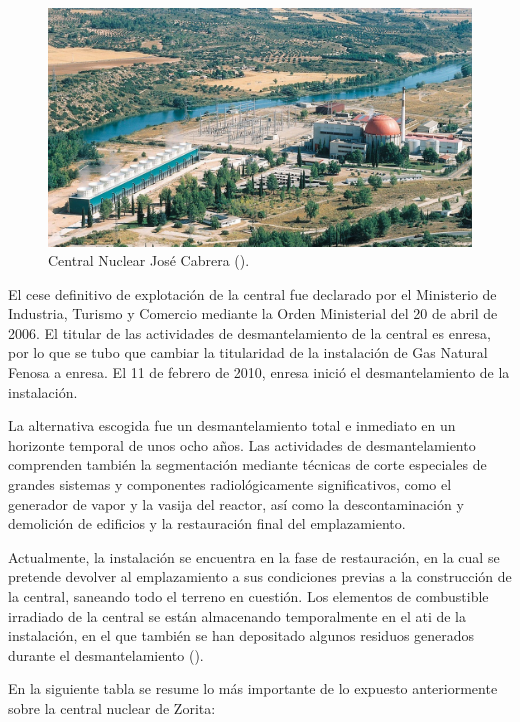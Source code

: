 \begin{figure}[h]
    \centering
    \includegraphics[width=\textwidth]{content/figures/zorita.jpg}
    \caption{Central Nuclear José Cabrera (\cite{sne_recursos_prensa}).}
    \label{fig:zorita}
\end{figure}

El cese definitivo de explotación de la central fue declarado por el Ministerio de Industria, Turismo y Comercio mediante la Orden Ministerial del 20 de abril de 2006. El titular de las actividades de desmantelamiento de la central es \acrshort{enresa}, por lo que se tubo que cambiar la titularidad de la instalación de Gas Natural Fenosa a \acrshort{enresa}. El 11 de febrero de 2010, \acrshort{enresa} inició el desmantelamiento de la instalación.

La alternativa escogida fue un desmantelamiento total e inmediato en un horizonte temporal de unos ocho años. Las actividades de desmantelamiento comprenden también la segmentación mediante técnicas de corte especiales de grandes sistemas y componentes radiológicamente significativos, como el generador de vapor y la vasija del reactor, así como la descontaminación y demolición de edificios y la restauración final del emplazamiento. 

Actualmente, la instalación se encuentra en la fase de restauración, en la cual se pretende devolver al emplazamiento a sus condiciones previas a la construcción de la central, saneando todo el terreno en cuestión. Los elementos de combustible irradiado de la central se están almacenando temporalmente en el \acrfull{ati} de la instalación, en el que también se han depositado algunos residuos generados durante el desmantelamiento (\cite{enresa_desmantelamiento_zorita}).

En la siguiente tabla se resume lo más importante de lo expuesto anteriormente sobre la central nuclear de Zorita:

